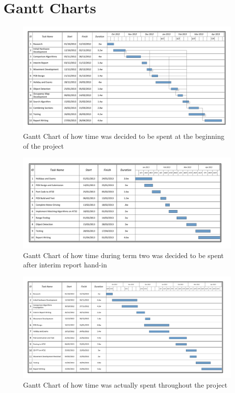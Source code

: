 \chapter{Gantt Charts} \label{Chapter:AppendixD:Gannt}

\begin{figure}
\centering
\includegraphics[angle = 90,height=\textheight]{Figures/Gantt.pdf} 
\caption{Gantt Chart of how time was decided to be spent at the beginning of the project}
\label{fig:Gantt:1}
\end{figure}
\clearpage
\begin{figure}
\centering
\includegraphics[angle = 90, height=\textheight]{Figures/Gantt2.pdf} 
\caption{Gantt Chart of how time during term two was decided to be spent after interim report hand-in}
\label{fig:Gantt:2}
\end{figure}

\begin{figure}
\centering
\includegraphics[angle = 90, height=\textheight]{Figures/Gantt3.pdf} 
\caption{Gantt Chart of how time was actually spent throughout the project}
\label{fig:Gantt:3}
\end{figure}